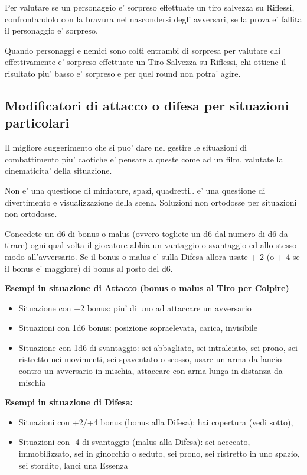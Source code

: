 \documentclass[a4paper,11pt,twoside,openany]{book}
\begin{document}
Per valutare se un personaggio e' sorpreso effettuate un tiro salvezza su Riflessi, confrontandolo con la bravura nel nascondersi degli avversari, se la prova e' fallita il personaggio e' sorpreso. 

Quando personaggi e nemici sono colti entrambi di sorpresa per valutare chi effettivamente e' sorpreso effettuate un Tiro Salvezza su Riflessi, chi ottiene il risultato piu' basso e' sorpreso e per quel round non potra' agire.

\subsection{Modificatori di attacco o difesa per situazioni particolari} 

Il migliore suggerimento che si puo' dare nel gestire le situazioni di combattimento piu' caotiche e' pensare a queste come ad un film, valutate la cinematicita' della situazione.

Non e' una questione di miniature, spazi, quadretti.. e' una questione di divertimento e visualizzazione della scena. Soluzioni non ortodosse per situazioni non ortodosse.

Concedete un d6 di bonus o malus (ovvero togliete un d6 dal numero di d6 da tirare) ogni qual volta il giocatore abbia un vantaggio o svantaggio ed allo stesso modo all'avversario. Se il bonus o malus e' sulla Difesa allora usate +-2 (o +-4 se il bonus e' maggiore) di bonus al posto del d6.

\bigskip

\textbf{Esempi in situazione di Attacco (bonus o malus al Tiro per Colpire)}

\begin{itemize}
	\item Situazione con +2 bonus: piu' di uno ad attaccare un avversario

	\item Situazioni con 1d6 bonus: posizione sopraelevata, carica, invisibile

	\item Situazione con 1d6 di svantaggio: sei abbagliato, sei intralciato, sei prono, sei ristretto nei movimenti, sei spaventato o scosso, usare un arma da lancio contro un avversario in mischia, attaccare con arma lunga in distanza da mischia
\end{itemize}

\textbf{Esempi in situazione di Difesa:}

\begin{itemize}
	\item Situazioni con +2/+4 bonus (bonus alla Difesa): hai copertura (vedi sotto),

	\item Situazioni con -4 di svantaggio (malus alla Difesa): sei accecato, immobilizzato, sei in ginocchio o seduto, sei prono, sei ristretto in uno spazio, sei stordito, lanci una Essenza 
\end{itemize}
\end{document}
